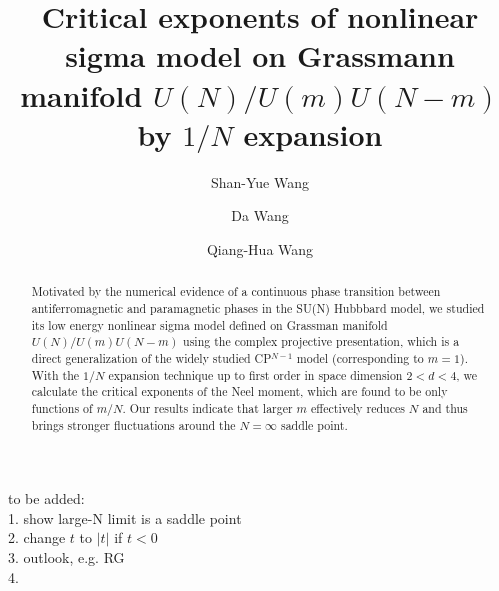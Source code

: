 \documentclass[aps,twocolumn,superscriptaddress]{revtex4-1}
\begin{document}
\title{Critical exponents of nonlinear sigma model on Grassmann manifold $U(N)/U(m)U(N-m)$ by $1/N$ expansion}
\author{Shan-Yue Wang}
\author{Da Wang}
\author{Qiang-Hua Wang}
\begin{abstract}
  Motivated by the numerical evidence of a continuous phase transition between antiferromagnetic and paramagnetic phases in the SU(N) Hubbbard model, we studied its low energy nonlinear sigma model defined on Grassman manifold $U(N)/U(m)U(N-m)$ using the complex projective presentation, which is a direct generalization of the widely studied CP$^{N-1}$ model (corresponding to $m=1$). With the $1/N$ expansion technique up to first order in space dimension $2<d<4$, we calculate the critical exponents of the Neel moment, which are found to be only functions of $m/N$. Our results indicate that larger $m$ effectively reduces $N$ and thus brings stronger fluctuations around the $N=\infty$ saddle point.
\end{abstract}
\maketitle

to be added: \\
1. show large-N limit is a saddle point \\
2. change $t$ to $|t|$ if $t<0$ \\
3. outlook, e.g. RG \\
4. 
\end{document}
